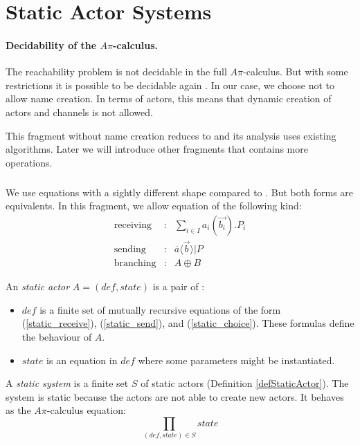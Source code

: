 \documentclass[a4paper]{report}
\numberwithin{algorithm}{chapter}
\begin{document}
\section{Static Actor Systems}

\paragraph{Decidability of the $A\pi$-calculus.}
The reachability problem is not decidable in the full $A\pi$-calculus.
But with some restrictions it is possible to be decidable again \cite{DBLP:journals/njc/AmadioM02}.
In our case, we choose not to allow name creation.
In terms of actors, this means that dynamic creation of actors and channels is not allowed.

This fragment without name creation reduces to \pns{} and its analysis uses existing algorithms.
Later we will introduce other fragments that contains more operations.

\subparagraph{}
We use equations with a sightly different shape compared to \cite{DBLP:journals/njc/AmadioM02}.
But both forms are equivalents.
In this fragment, we allow equation of the following kind:
\begin{eqnarray}
\label{static_receive}  \text{receiving} & : & \sum_{i \in I} a_i (\vec{b_i}).P_i \\
\label{static_send}     \text{sending} & : &    \overline{a}\langle \vec{b} \rangle | P \\
\label{static_choice}   \text{branching} & : &    A \oplus B
\end{eqnarray}

\begin{define}
\label{defStaticActor}
An \emph{static actor} $A = (\mathit{def},\mathit{state})$ is a pair of :
\begin{itemize}
\item $\mathit{def}$ is a finite set of mutually recursive equations of the form (\ref{static_receive}), (\ref{static_send}), and (\ref{static_choice}).
These formulas define the behaviour of $A$.
\item $\mathit{state}$ is an equation in $\mathit{def}$ where some parameters might be instantiated.
\end{itemize}
\end{define}

\begin{define}
\label{defStaticSys}
A \emph{static system} is a finite set $S$ of static actors (Definition \ref{defStaticActor}).
The system is static because the actors are not able to create new actors.
It behaves as the $A\pi$-calculus equation:
\begin{equation*}
\prod_{(\mathit{def},\mathit{state}) \in S} \mathit{state}
\end{equation*}
\end{define}
\end{document}
